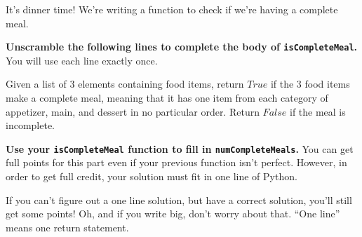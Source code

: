 
It's dinner time! We're writing a function to check if we're having a complete meal. 

\textbf{Unscramble the following lines to complete the body of \texttt{isCompleteMeal}.} You will use each line exactly once.

Given a list of 3 elements containing food items, return $True$ if the 3 food items make a complete meal, meaning that it has one item from each category of appetizer, main, and dessert in no particular order. Return $False$ if the meal is incomplete.



\solutionimage{

}{}


\textbf{Use your \texttt{isCompleteMeal} function to fill in \texttt{numCompleteMeals}.} You can get full points for this part even if your previous function isn't perfect. However, in order to get full credit, your solution must fit in one line of Python. 

If you can’t figure out a one line solution, but have a correct solution, you’ll still get some points! Oh, and if you write big, don’t worry about that. “One line” means one return statement.

\solutionimage{

}{}